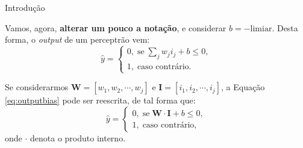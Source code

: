 \begin{frame}{Introdução \cont}
		
	Vamos, agora, \textbf{alterar um pouco a notação}, e considerar $b = -\text{limiar}$. Desta forma, o \textit{output} de um perceptrão vem:
	\begin{equation}
		\label{eq:outputbias}
		\hat{y} = \begin{cases}
		0, \; \text{se} \; \sum_j w_j i_j + b \leq 0, \\
		1, \; \text{caso contrário}.
		\end{cases}
	\end{equation}
		    
		    
	\pauseskip
		
	Se considerarmos $\mathbf{W} = \left [ w_1, w_2, \cdots, w_j \right ]$ e $\mathbf{I} = \left [ i_1, i_2, \cdots, i_j \right ]$, a Equação \eqref{eq:outputbias} pode ser reescrita, de tal forma que:
	\begin{equation}
		\hat{y} = \begin{cases}
		0, \; \text{se} \; \mathbf{W} \cdot \mathbf{I} + b \leq 0, \\
		1, \; \text{caso contrário},
		\end{cases}
	\end{equation}
	onde $\cdot$ denota o produto interno.
		
		
\end{frame}

